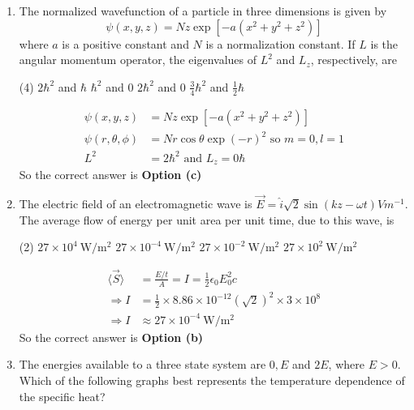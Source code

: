 \begin{enumerate}
\begin{answer}
\end{answer}
\item The normalized wavefunction of a particle in three dimensions is given by
$$
\psi(x, y, z)=N z \exp \left[-a\left(x^{2}+y^{2}+z^{2}\right)\right]
$$
where $a$ is a positive constant and $N$ is a normalization constant. If $L$ is the angular momentum operator, the eigenvalues of $L^{2}$ and $L_{z}$, respectively, are
 \begin{tasks}(4)
	\task[\textbf{a.}]$2 \hbar^{2}$ and $\hbar$
	\task[\textbf{b.}]$\hbar^{2}$ and 0
	\task[\textbf{c.}] $2 \hbar^{2}$ and 0
	\task[\textbf{d.}] $\frac{3}{4} \hbar^{2}$ and $\frac{1}{2} \hbar$
\end{tasks}
\begin{answer}
	\begin{align*}
	\psi(x, y, z)&=N z \exp \left[-a\left(x^{2}+y^{2}+z^{2}\right)\right]\\
	\psi(r, \theta, \phi)&=N r \cos \theta \exp (-r)^{2} \text { so } m=0, l=1\\
	L^{2}&=2 \hbar^{2} \text { and } L_{z}=0 \hbar
	\end{align*}
		So the correct answer is \textbf{Option (c)}
\end{answer}
\item The electric field of an electromagnetic wave is $\vec{E}=\hat{i} \sqrt{2} \sin (k z-\omega t) V m^{-1}$. The average flow of energy per unit area per unit time, due to this wave, is
 \begin{tasks}(2)
	\task[\textbf{a.}]$27 \times 10^{4} \mathrm{~W} / \mathrm{m}^{2}$
	\task[\textbf{b.}]$27 \times 10^{-4} \mathrm{~W} / \mathrm{m}^{2}$
	\task[\textbf{c.}]$27 \times 10^{-2} \mathrm{~W} / \mathrm{m}^{2}$
	\task[\textbf{d.}] $27 \times 10^{2} \mathrm{~W} / \mathrm{m}^{2}$
\end{tasks}
\begin{answer}
	\begin{align*}
	\langle\vec{S}\rangle&=\frac{E / t}{A}=I=\frac{1}{2} \epsilon_{0} E_{0}^{2} c\\
	\Rightarrow I&=\frac{1}{2} \times 8.86 \times 10^{-12}(\sqrt{2})^{2} \times 3 \times 10^{8}\\
	\Rightarrow I &\approx 27 \times 10^{-4} \mathrm{~W} / \mathrm{m}^{2}
	\end{align*}
		So the correct answer is \textbf{Option (b)}
\end{answer}
\item The energies available to a three state system are $0, E$ and $2 E$, where $E>0$. Which of the following graphs best represents the temperature dependence of the specific heat?

\end{enumerate}
